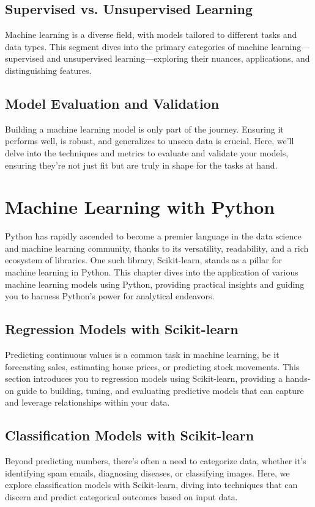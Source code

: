 \documentclass{book}
\begin{document}
\section{Supervised vs. Unsupervised Learning}
Machine learning is a diverse field, with models tailored to different tasks and data types. This segment dives into the primary categories of machine learning—supervised and unsupervised learning—exploring their nuances, applications, and distinguishing features.

\section{Model Evaluation and Validation}
Building a machine learning model is only part of the journey. Ensuring it performs well, is robust, and generalizes to unseen data is crucial. Here, we'll delve into the techniques and metrics to evaluate and validate your models, ensuring they're not just fit but are truly in shape for the tasks at hand.

\chapter{Machine Learning with Python}
Python has rapidly ascended to become a premier language in the data science and machine learning community, thanks to its versatility, readability, and a rich ecosystem of libraries. One such library, Scikit-learn, stands as a pillar for machine learning in Python. This chapter dives into the application of various machine learning models using Python, providing practical insights and guiding you to harness Python's power for analytical endeavors.

\section{Regression Models with Scikit-learn}
Predicting continuous values is a common task in machine learning, be it forecasting sales, estimating house prices, or predicting stock movements. This section introduces you to regression models using Scikit-learn, providing a hands-on guide to building, tuning, and evaluating predictive models that can capture and leverage relationships within your data.

\section{Classification Models with Scikit-learn}
Beyond predicting numbers, there's often a need to categorize data, whether it's identifying spam emails, diagnosing diseases, or classifying images. Here, we explore classification models with Scikit-learn, diving into techniques that can discern and predict categorical outcomes based on input data.
\end{document}
